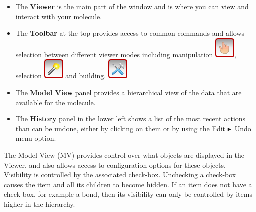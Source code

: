 \documentclass[a4paper,12pt]{article}
\newcommand{\bt}{\ensuremath{\blacktriangleright}}
\begin{document}
\begin{itemize}
\item The {\bf Viewer} is the main part of the window and is where you can
      view and interact with your molecule.
\item The {\bf Toolbar} at the top provides access to common commands and allows selection
      between different viewer modes including manipulation 
      \includegraphics[scale=0.40]{figures/ManipulateButton.png}, selection 
      \includegraphics[scale=0.40]{figures/SelectButton.png} and building.
      \includegraphics[scale=0.40]{figures/BuildButton.png}
\item The {\bf Model View} panel provides a hierarchical view of the data that
      are available for the molecule.
\item The {\bf History} panel in the lower left shows a list of the most recent
      actions than can be undone, either by clicking on them or by using the
      Edit \bt\ Undo menu option. 
\end{itemize}

The Model View (MV) provides control over what objects are displayed in the Viewer,
and also allows access to configuration options for these objects.  Visibility is
controlled by the associated check-box.  Unchecking a check-box causes the item
and all its children to become hidden.  If an item does not have a check-box,
for example a bond, then its visibility can only be controlled by items higher
in the hierarchy.  
\end{document}
